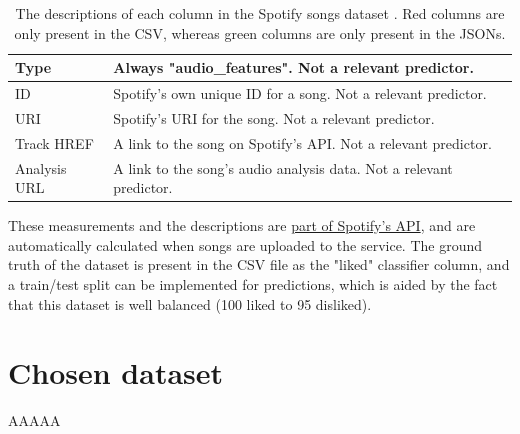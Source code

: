 \documentclass[12pt]{report}
\begin{document}
\begin{table}[H]
\begin{tabular}{ |p{} | p{}|}
            \hline
            \cellcolor{green!15}Type & Always "audio\_features". Not a relevant predictor.\\
            \hline
            \cellcolor{green!15}ID & Spotify's own unique ID for a song. Not a relevant predictor.\\
            \hline
            \cellcolor{green!15}URI & Spotify's URI for the song. Not a relevant predictor.\\
            \hline
            \cellcolor{green!15}Track HREF & A link to the song on Spotify's API. Not a relevant predictor.\\  
            \hline
            \cellcolor{green!15}Analysis URL & A link to the song's audio analysis data. Not a relevant predictor. \\
            \hline
    \end{tabular}
    \caption{The descriptions of each column in the Spotify songs dataset \autocite{spotify_web_nodate}. Red columns are only present in the CSV, whereas green columns are only present in the JSONs.}\label{tab:Spotify-Types}
\end{table}

These measurements and the descriptions are \href{https://developer.spotify.com/documentation/web-api/reference/get-audio-features}{part of Spotify's API},
and are automatically calculated when songs are uploaded to the service. The ground truth of the dataset is present in the CSV file as the "liked" classifier 
column, and a train/test split can be implemented for predictions, which is aided by the fact that this dataset is well balanced (100 liked to 95 disliked).

\section{Chosen dataset}
AAAAA
\end{document}
